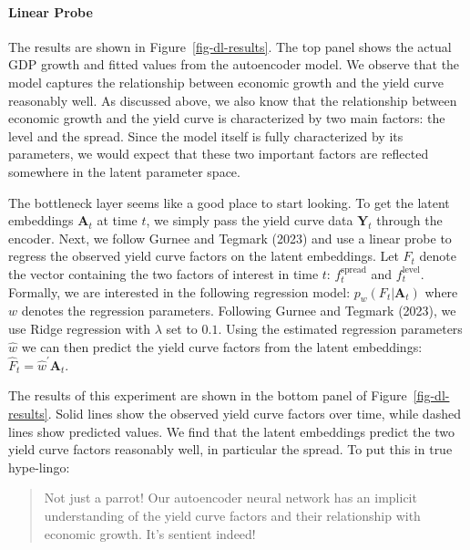 \documentclass[
  letterpaper,
  DIV=11,
  numbers=noendperiod]{scrartcl}
\let\oldparagraph\paragraph
\renewcommand{\paragraph}[1]{\oldparagraph{#1}\mbox{}}
\theoremstyle{plain}
\theoremstyle{remark}
\begin{document}
\paragraph{Linear Probe}\label{linear-probe}

The results are shown in Figure~\ref{fig-dl-results}. The top panel
shows the actual GDP growth and fitted values from the autoencoder
model. We observe that the model captures the relationship between
economic growth and the yield curve reasonably well. As discussed above,
we also know that the relationship between economic growth and the yield
curve is characterized by two main factors: the level and the spread.
Since the model itself is fully characterized by its parameters, we
would expect that these two important factors are reflected somewhere in
the latent parameter space.

The bottleneck layer seems like a good place to start looking. To get
the latent embeddings \(\mathbf{A}_t\) at time \(t\), we simply pass the
yield curve data \(\mathbf{Y}_t\) through the encoder. Next, we follow
Gurnee and Tegmark (2023) and use a linear probe to regress the observed
yield curve factors on the latent embeddings. Let \(F_t\) denote the
vector containing the two factors of interest in time \(t\):
\(f_t^{\text{spread}}\) and \(f_t^{\text{level}}\). Formally, we are
interested in the following regression model:
\(p_{w}(F_t|\mathbf{A}_t)\) where \(w\) denotes the regression
parameters. Following Gurnee and Tegmark (2023), we use Ridge regression
with \(\lambda\) set to \(0.1\). Using the estimated regression
parameters \(\hat{w}\) we can then predict the yield curve factors from
the latent embeddings: \(\hat{F}_t=\hat{w}^{\prime}\mathbf{A}_t\).

The results of this experiment are shown in the bottom panel of
Figure~\ref{fig-dl-results}. Solid lines show the observed yield curve
factors over time, while dashed lines show predicted values. We find
that the latent embeddings predict the two yield curve factors
reasonably well, in particular the spread. To put this in true
hype-lingo:

\begin{quote}
Not just a parrot! Our autoencoder neural network has an implicit
understanding of the yield curve factors and their relationship with
economic growth. It's sentient indeed!
\end{quote}
\end{document}
